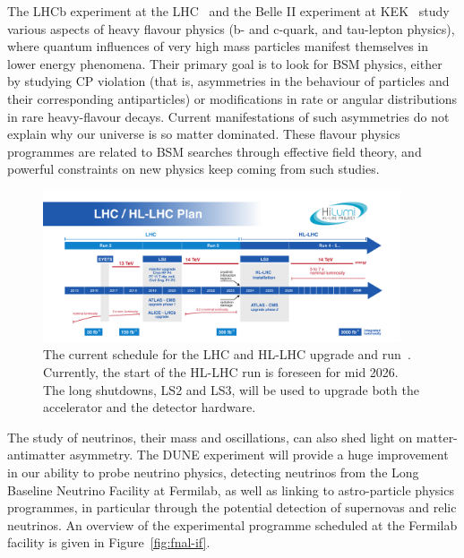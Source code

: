 The LHCb experiment at the LHC~\cite{LHCb} and the Belle II experiment at
KEK~\cite{BelleII} study various aspects of heavy
flavour physics (b- and c-quark, and tau-lepton physics), where quantum
influences of very high mass particles manifest themselves in lower
energy phenomena. Their primary goal is to look for BSM physics, either
by studying CP violation (that is, asymmetries in the behaviour of
particles and their corresponding antiparticles) or modifications in
rate or angular distributions in rare heavy-flavour decays. Current
manifestations of such asymmetries do not explain why our universe is so
matter dominated. These flavour physics programmes are related to BSM
searches through effective field theory, and powerful constraints on new
physics keep coming from such studies.

\begin{figure}[bthp]
    \centering
    \includegraphics[width=0.94\textwidth]{HL-LHC-plan-2017-Plan-2.pdf}
    \caption{The current schedule for the LHC and HL-LHC upgrade
and run~\cite{HL-LHC}. Currently, the start of the HL-LHC run is foreseen for mid
2026. The long shutdowns, LS2 and LS3, will be used to upgrade both the
accelerator and the detector hardware.}
    \label{fig:hl-lhc}
\end{figure}

The study of neutrinos, their mass and oscillations, can also shed light
on matter-antimatter asymmetry. The DUNE experiment will provide a huge
improvement in our ability to probe neutrino physics, detecting
neutrinos from the Long Baseline Neutrino Facility at Fermilab, as well
as linking to astro-particle physics programmes, in particular through
the potential detection of supernovas and relic neutrinos. An overview
of the experimental programme scheduled at the Fermilab facility is
given in Figure~\ref{fig:fnal-if}.

